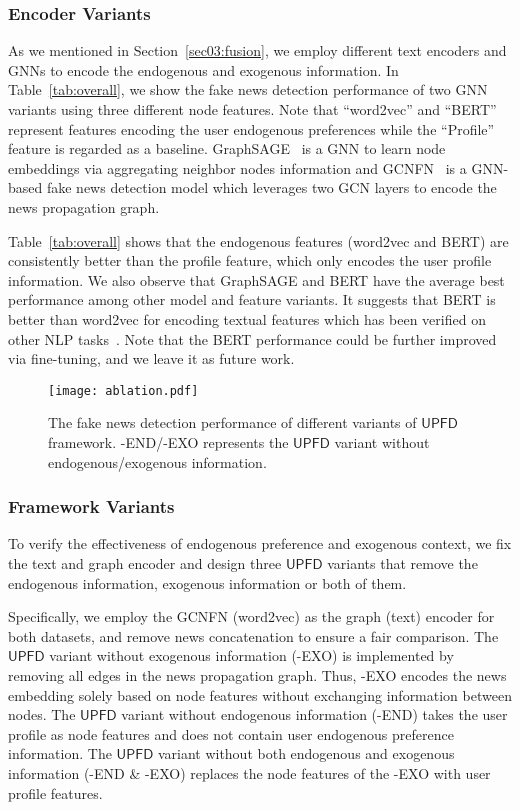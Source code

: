 \documentclass[sigconf]{acmart}
\newcommand\UPFD{$\mathsf{UPFD}$\xspace}
\begin{document}
\subsubsection{Encoder Variants}
As we mentioned in Section~\ref{sec03:fusion}, we employ different text encoders and GNNs to encode the endogenous and exogenous information.
In Table~\ref{tab:overall}, we show the fake news detection performance of two GNN variants using three different node features.
Note that ``word2vec'' and ``BERT'' represent features encoding the user endogenous preferences while the ``Profile'' feature is regarded as a baseline.
GraphSAGE~\cite{hamilton2017inductive} is a GNN to learn node embeddings via aggregating neighbor nodes information and
GCNFN~\cite{monti2019fake} is a GNN-based fake news detection model which leverages two GCN layers to encode the news propagation graph.

Table~\ref{tab:overall} shows that the endogenous features (word2vec and BERT) are consistently better than the profile feature, which only encodes the user profile information.
We also observe that GraphSAGE and BERT have the average best performance among other model and feature variants.
It suggests that BERT is better than word2vec for encoding textual features which has been verified on other NLP tasks~\cite{devlin2018bert}.
Note that the BERT performance could be further improved via fine-tuning, and we leave it as future work.


\begin{figure}[h]
    \centering
    \texttt{[image: ablation.pdf]}
    \caption{The fake news detection performance of different variants of \UPFD framework. -END/-EXO represents the \UPFD variant without endogenous/exogenous information.}
    \label{fig:ablation}
\end{figure}


\subsubsection{Framework Variants}
To verify the effectiveness of endogenous preference and exogenous context, we fix the text and graph encoder and design three \UPFD variants that remove the endogenous information, exogenous information or both of them.

Specifically, we employ the GCNFN (word2vec) as the graph (text) encoder for both datasets, and remove news concatenation to ensure a fair comparison.
The \UPFD variant without exogenous information (-EXO) is implemented by removing all edges in the news propagation graph.
Thus, -EXO encodes the news embedding solely based on node features without exchanging information between nodes.
The \UPFD variant without endogenous information (-END) takes the user profile as node features and does not contain user endogenous preference information.
The \UPFD variant without both endogenous and exogenous information (-END \& -EXO) replaces the node features of the -EXO with user profile features.
\end{document}
